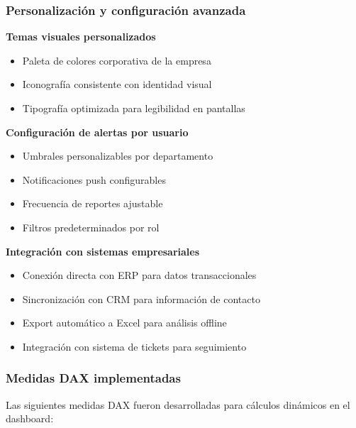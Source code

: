\subsubsection{Personalización y configuración avanzada}

\textbf{Temas visuales personalizados}
\begin{itemize}
    \item Paleta de colores corporativa de la empresa
    \item Iconografía consistente con identidad visual
    \item Tipografía optimizada para legibilidad en pantallas
\end{itemize}

\textbf{Configuración de alertas por usuario}
\begin{itemize}
    \item Umbrales personalizables por departamento
    \item Notificaciones push configurables
    \item Frecuencia de reportes ajustable
    \item Filtros predeterminados por rol
\end{itemize}

\textbf{Integración con sistemas empresariales}
\begin{itemize}
    \item Conexión directa con ERP para datos transaccionales
    \item Sincronización con CRM para información de contacto
    \item Export automático a Excel para análisis offline
    \item Integración con sistema de tickets para seguimiento
\end{itemize}

\subsubsection{Medidas DAX implementadas}

Las siguientes medidas DAX fueron desarrolladas para cálculos dinámicos en el dashboard:

